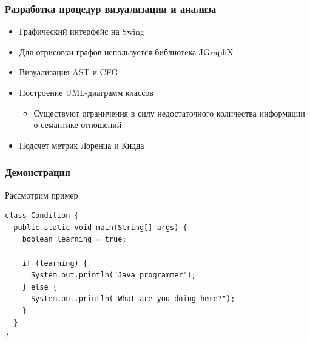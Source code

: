 \documentclass[handout]{beamer}
\begin{document}
\begin{frame}
\frametitle{Разработка процедур визуализации и анализа}

\begin{itemize}
    \item Графический интерфейс на Swing
    \item Для отрисовки графов используется библиотека JGraphX
    \item Визуализация AST и CFG
    \item Построение UML-диаграмм классов
        \begin{itemize}
            \item Существуют ограничения в силу недостаточного количества
            информации о семантике отношений
        \end{itemize}
    \item Подсчет метрик Лоренца и Кидда
\end{itemize}

\end{frame}
\begin{frame}[fragile]
\frametitle{Демонстрация}

Рассмотрим пример:

\begin{lstlisting}
class Condition {
  public static void main(String[] args) {
    boolean learning = true;

    if (learning) {
      System.out.println("Java programmer");
    } else {
      System.out.println("What are you doing here?");
    }
  }
}
\end{lstlisting}

\end{frame}
\end{document}
